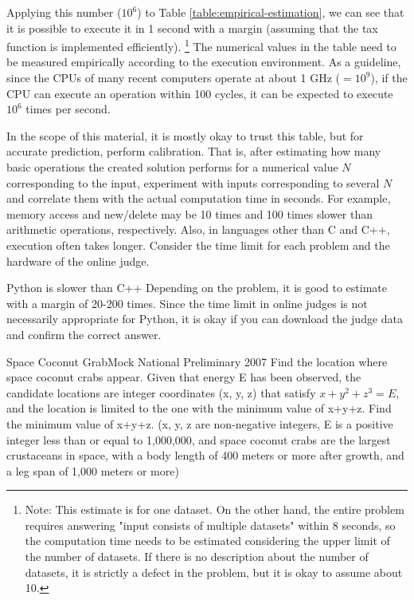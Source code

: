 Applying this number ($10^6$) to Table \ref{table:empirical-estimation}, we can see that it is possible to execute it in 1 second with a margin (assuming that the tax function is implemented efficiently). \footnote{Note: This estimate is for one dataset. On the other hand, the entire problem requires answering "input consists of multiple datasets" within 8 seconds, so the computation time needs to be estimated considering the upper limit of the number of datasets. If there is no description about the number of datasets, it is strictly a defect in the problem, but it is okay to assume about 10.}
The numerical values in the table need to be measured empirically according to the execution environment.
As a guideline, since the CPUs of many recent computers operate at about 1 GHz ($=10^{9}$), if the CPU can execute an operation within 100 cycles, it can be expected to execute $10^6$ times per second.

In the scope of this material, it is mostly okay to trust this table, but for accurate prediction, perform calibration. That is, after estimating how many basic operations the created solution performs for a numerical value $N$ corresponding to the input, experiment with inputs corresponding to several $N$ and correlate them with the actual computation time in seconds. For example, memory access and new/delete may be 10 times and 100 times slower than arithmetic operations, respectively. Also, in languages other than C and C++, execution often takes longer. Consider the time limit for each problem and the hardware of the online judge.

\begin{tipsbox}{Python is slower than C++}
  Depending on the problem, it is good to estimate with a margin of 20-200 times. Since the time limit in online judges is not necessarily appropriate for Python, it is okay if you can download the judge data and confirm the correct answer.
\end{tipsbox}


\begin{pbox}{Space Coconut Grab}{Mock National Preliminary 2007}
Find the location where space coconut crabs appear. Given that energy E has been observed, the candidate locations are integer coordinates (x, y, z) that satisfy $x+y^2+z^3=E$, and the location is limited to the one with the minimum value of x+y+z. Find the minimum value of x+y+z.
(x, y, z are non-negative integers, E is a positive integer less than or equal to 1,000,000, and space coconut crabs are the largest crustaceans in space, with a body length of 400 meters or more after growth, and a leg span of 1,000 meters or more)

\end{pbox}

